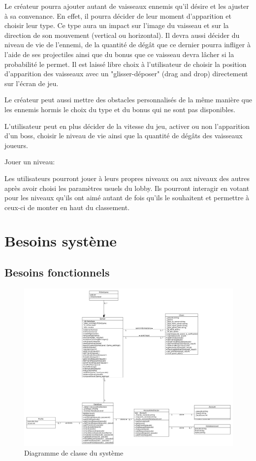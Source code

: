 \documentclass[a4paper,12pt]{article}
\begin{document}
Le créateur pourra ajouter autant de vaisseaux ennemis qu'il désire et les ajuster à sa convenance.
En effet, il pourra décider de leur moment d'apparition et choisir leur type. Ce type aura un impact sur l'image du vaisseau et sur la direction de son mouvement (vertical ou horizontal). Il devra aussi décider du niveau de vie de l'ennemi, de la quantité de dégât que ce dernier pourra infliger à l'aide de ses projectiles ainsi que du bonus que ce vaisseau devra lâcher si la probabilité le permet. Il est laissé libre choix à l'utilisateur de choisir la position d'apparition des vaisseaux avec un "glisser-déposer" (drag and drop) directement sur l'écran de jeu. 

Le créateur peut aussi mettre des obstacles personnalisés de la même manière que les ennemis hormis le choix du type et du bonus qui ne sont pas disponibles. 

L'utilisateur peut en plus décider de la vitesse du jeu, activer ou non l'apparition d'un boss, choisir le niveau de vie ainsi que la quantité de dégâts des vaisseaux joueurs. 

Jouer un niveau: 

Les utilisateurs pourront jouer à leurs propres niveaux ou aux niveaux des autres après avoir choisi les paramètres usuels du lobby. Ils pourront interagir en votant pour les niveaux qu'ils ont aimé autant de fois qu'ils le souhaitent et permettre à ceux-ci de monter en haut du classement. 

\newpage



\newpage

\section{Besoins système}
\subsection{Besoins fonctionnels}

\begin{figure}[h!]
\centering
\includegraphics[width=16cm]{images/newSystemClassDiagram.png}
\caption{Diagramme de classe du système}
\label{fig:UerUseCase}
\end{figure}
\end{document}
